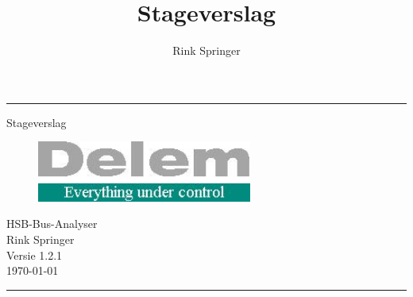 \documentclass[a4paper,11pt]{book}
\author{Rink Springer}
\title{Stageverslag}
\begin{document}
\frontmatter

\begin{titlepage}
\hrule
\vspace*{\fill}
\begin{center}
{\Huge Stageverslag} \\
\vspace{2cm}
\begin{figure}[htb]
\begin{center}
\includegraphics[height=2cm]{delem_logo.jpg}
\end{center}
\end{figure}
HSB-Bus-Analyser\\
\vspace{2cm}
{\large Rink Springer}\\
\vspace{2cm}
Versie 1.2.1\\
\today\\
\vspace{2cm}
\end{center}
\vspace*{\fill}
\hrule
\vspace*{\fill}
\end{titlepage}





\tableofcontents







\mainmatter















\appendix







\backmatter
\printindex
\end{document}
